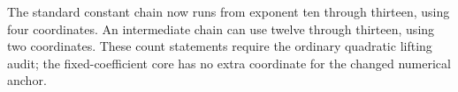 The standard constant chain now runs from exponent ten through thirteen,
using four coordinates. An intermediate chain can use twelve through
thirteen, using two coordinates. These count statements require the
ordinary quadratic lifting audit; the fixed-coefficient core has no extra
coordinate for the changed numerical anchor.
